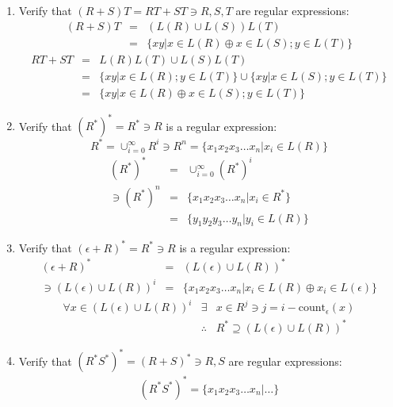 \documentclass[12pt,a4paper,twoside]{article}  %
\begin{document}
\begin{enumerate}
\item Verify that $(R + S)T = RT + ST \ni R,S,T$ are regular expressions:
\begin{eqnarray}
(R + S)T &=& (L(R) \cup L(S))L(T) \nonumber\\
         &=& \{xy | x \in L(R) \oplus x \in L(S); y \in L(T)\}
\end{eqnarray}
\begin{eqnarray}
RT + ST &=& L(R)L(T) \cup L(S)L(T) \nonumber\\
        &=& \{xy | x \in L(R); y \in L(T)\} \cup \{xy | x \in L(S); y \in L(T)\} \nonumber\\
        &=& \{xy | x \in L(R) \oplus x \in L(S); y \in L(T)\}
\end{eqnarray}

\item Verify that $(R^*)^* = R^* \ni R$ is a regular expression:
\begin{equation}
R^* = \cup_{i=0}^\infty R^i \ni R^n = \{x_1x_2x_3{\ldots}x_n | x_i \in L(R)\}
\end{equation}
\begin{eqnarray}
    (R^*)^* &=& \cup_{i=0}^\infty (R^*)^i \\
\ni (R^*)^n &=& \{x_1x_2x_3{\ldots}x_n | x_i \in R^*\} \nonumber\\
            &=& \{y_1y_2y_3{\ldots}y_n | y_i \in L(R)\}
\end{eqnarray}

\item Verify that $(\epsilon + R)^* = R^* \ni R$ is a regular expression:
\begin{eqnarray}
(\epsilon + R)^* &=& (L(\epsilon) \cup L(R))^* \nonumber\\
\ni (L(\epsilon) \cup L(R))^i &=& \{x_1x_2x_3{\ldots}x_n | x_i \in L(R) \oplus x_i \in L(\epsilon)\}
\end{eqnarray}
\begin{eqnarray}
\forall x \in (L(\epsilon) \cup L(R))^i & \exists & x \in R^j \ni j = i - \textrm{count}_\epsilon(x) \nonumber\\
                                        & \therefore & R^* \supseteq (L(\epsilon) \cup L(R))^*
\end{eqnarray}

\item Verify that $(R^*S^*)^* = (R + S)^* \ni R,S$ are regular expressions:
\begin{eqnarray}
(R^*S^*)^* = \{x_1x_2x_3{\ldots}x_n | \ldots\}
\end{eqnarray}

\end{enumerate}
\end{document}
